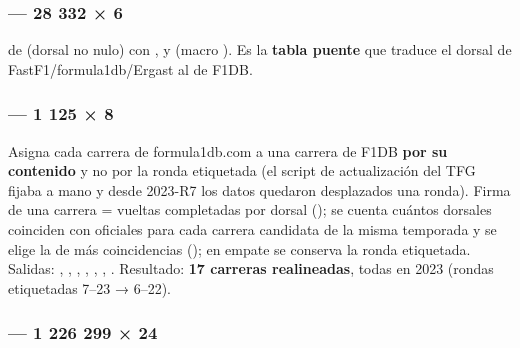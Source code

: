 \subsubsection{ — 28 332 × 6}

 de  (dorsal no nulo) con ,  y  (macro ). Es la \textbf{tabla puente} que traduce el dorsal de FastF1/formula1db/Ergast al  de F1DB.

\subsubsection{ — 1 125 × 8}

Asigna cada carrera de formula1db.com a una carrera de F1DB \textbf{por su contenido} y no por la ronda etiquetada (el script de actualización del TFG fijaba  a mano y desde 2023-R7 los datos quedaron desplazados una ronda). Firma de una carrera = vueltas completadas por dorsal (); se cuenta cuántos dorsales coinciden con  oficiales para cada carrera candidata de la misma temporada y se elige la de más coincidencias (); en empate se conserva la ronda etiquetada. Salidas: , , , , , , . Resultado: \textbf{17 carreras realineadas}, todas en 2023 (rondas etiquetadas 7–23 → 6–22).

\subsubsection{ — 1 226 299 × 24}

